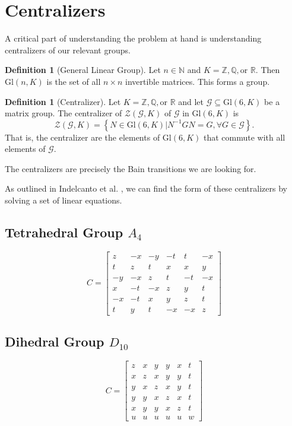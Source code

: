 \documentclass[a4paper,10pt]{article}
\theoremstyle{plain}
\theoremstyle{definition}
\newtheorem{Definition}[Theorem]{Definition}
\theoremstyle{remark}
\newcommand{\R}{\mathbb{R}}
\newcommand{\Q}{\mathbb{Q}}
\newcommand{\N}{\mathbb{N}}
\newcommand{\Z}{\mathbb{Z}}
\newcommand\Gl{\text{Gl}}
\begin{document}
\section{Centralizers} \label{Centralizers}
A critical part of understanding the problem at hand is understanding centralizers of our relevant groups.
\begin{Definition}[General Linear Group]
    Let \(n \in \N\) and \(K = \Z, \Q, \text{or } \R\).
    Then \(\Gl(n, K)\) is the set of all \(n \times n\) invertible matrices.
    This forms a group.
\end{Definition}
\begin{Definition}[Centralizer]
    Let \(K = \Z, \Q, \text{or } \R\) and let \(\mathcal{G} \subseteq \Gl(6, K)\) be a matrix group.
    The centralizer of \(\mathcal{Z}(\mathcal{G}, K)\) of \(\mathcal{G}\) in \(\Gl(6, K)\) is
    \[\mathcal{Z}(\mathcal{G}, K) = \left\{N \in \Gl(6, K) | N^{-1}GN = G, \forall G \in \mathcal{G}\right\}.\]
    That is, the centralizer are the elements of \(\Gl(6, K)\) that commute with all elements of \(\mathcal{G}\).
\end{Definition}
The centralizers are precisely the Bain transitions we are looking for.

As outlined in Indelcanto et al. \cite{indelicatoetal2012}, we can find the form of these centralizers by solving a set of linear equations.

\subsection{Tetrahedral Group \(A_4\)}
\[C = \begin{bmatrix}
    z  & -x & -y & -t & t  & -x \\
    t  & z  & t  & x  & x  & y  \\
    -y & -x & z  & t  & -t & -x \\
    x  & -t & -x & z  & y  & t  \\
    -x & -t & x  & y  & z  & t  \\
    t  & y  & t  & -x & -x & z 
\end{bmatrix}\]

\subsection{Dihedral Group \(D_{10}\)}
\[C = \begin{bmatrix}
    z & x & y & y & x & t \\
    x & z & x & y & y & t \\
    y & x & z & x & y & t \\
    y & y & x & z & x & t \\
    x & y & y & x & z & t \\
    u & u & u & u & u & w
\end{bmatrix}\]
\end{document}
